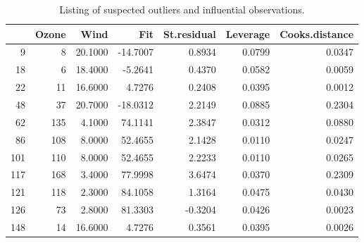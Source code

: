 \begin{table}[ht]
\centering
\begin{tabular}{rrrrrrr}
  \hline
 & Ozone & Wind & Fit & St.residual & Leverage & Cooks.distance \\ 
  \hline
9 &     8 & 20.1000 & -14.7007 & 0.8934 & 0.0799 & 0.0347 \\ 
  18 &     6 & 18.4000 & -5.2641 & 0.4370 & 0.0582 & 0.0059 \\ 
  22 &    11 & 16.6000 & 4.7276 & 0.2408 & 0.0395 & 0.0012 \\ 
  48 &    37 & 20.7000 & -18.0312 & 2.2149 & 0.0885 & 0.2304 \\ 
  62 &   135 & 4.1000 & 74.1141 & 2.3847 & 0.0312 & 0.0880 \\ 
  86 &   108 & 8.0000 & 52.4655 & 2.1428 & 0.0110 & 0.0247 \\ 
  101 &   110 & 8.0000 & 52.4655 & 2.2233 & 0.0110 & 0.0265 \\ 
  117 &   168 & 3.4000 & 77.9998 & 3.6474 & 0.0370 & 0.2309 \\ 
  121 &   118 & 2.3000 & 84.1058 & 1.3164 & 0.0475 & 0.0430 \\ 
  126 &    73 & 2.8000 & 81.3303 & -0.3204 & 0.0426 & 0.0023 \\ 
  148 &    14 & 16.6000 & 4.7276 & 0.3561 & 0.0395 & 0.0026 \\ 
   \hline
\end{tabular}
\caption{Listing of suspected outliers and influential observations.} 
\label{InflObsMyModel}
\end{table}
